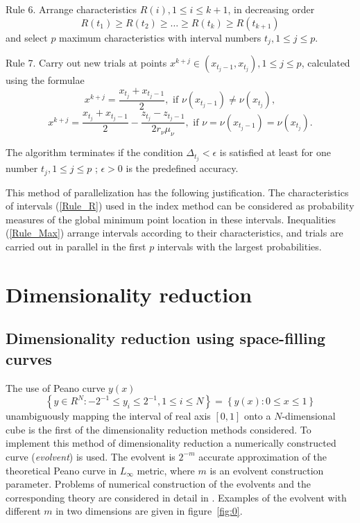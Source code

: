 \documentclass[a4paper]{jpconf}
\begin{document}
Rule 6. Arrange characteristics  $R(i), 1 \leq i \leq k+1$, in decreasing order 
\begin{equation}\label{Rule_Max}
R(t_1)\geq R(t_2)\geq \dots \geq R(t_{k}) \geq R(t_{k+1})
\end{equation}
and select $p$ maximum characteristics with interval numbers $t_j, 1\leq j \leq p$.

Rule 7. Carry out new trials at points $x^{k+j}\in(x_{t_j-1},x_{t_j}), 1\leq j\leq p$, calculated using the formulae
\[
x^{k+j} = \frac{x_{t_j} + x_{t_j-1}}{2}, \textrm{ if } \nu(x_{t{_j}-1}) \neq \nu(x_{t_j}),
\]
\begin{equation}\label{Rule_X}
x^{k+j} = \frac{x_{t_j}+x_{t_j-1}}{2} - \frac{z_{t_j}-z_{t_j-1}}{2r_\nu \mu_\nu}, \textrm{ if } \nu=\nu(x_{t_j-1})=\nu(x_{t_j}).
\end{equation}

The algorithm terminates if the condition $\Delta_{t_j}<\epsilon$ is satisfied at least for one number $t_j, 1 \leq j \leq p$ ; $\epsilon>0$ is the predefined accuracy.

This method of parallelization has the following justification. The characteristics of intervals (\ref{Rule_R}) used in the index method can be considered as probability measures of the global minimum point location in these intervals. Inequalities (\ref{Rule_Max}) arrange intervals according to their characteristics, and trials are carried out in parallel in the first $p$ intervals with the largest probabilities.

\section{Dimensionality reduction}

\subsection{Dimensionality reduction using space-filling curves}

The use of Peano curve $y(x)$ 
\[
\left\{y\in R^N: -2^{-1}\leq y_i \leq 2^{-1}, 1 \leq i \leq 
N\right\}=\left\{y(x):0\leq x \leq 1 \right\}
\]
unambiguously mapping the interval of real axis $[0,1]$ onto a $N$-dimensional cube is the first of the dimensionality reduction methods considered.  To implement this method of dimensionality reduction a 
numerically constructed curve (\textit{evolvent}) is used. The evolvent is 
$2^{-m}$ accurate approximation of the theoretical Peano curve in $L_\infty$ 
metric, where $m$ is an evolvent construction parameter. Problems of 
numerical construction of the evolvents and the corresponding theory are 
considered in detail in \cite{Strongin2000}. Examples of the evolvent with different $m$ in two dimensions are given in figure~\ref{fig:0}.
\end{document}
